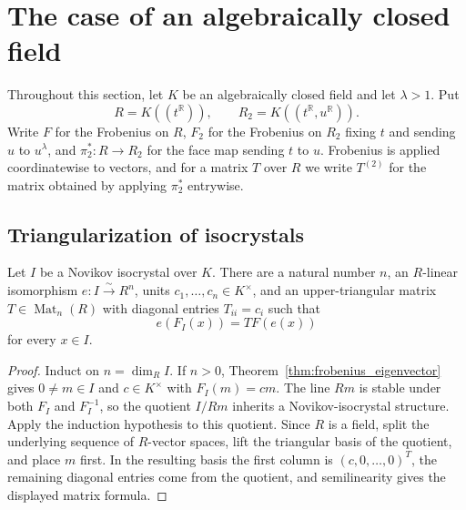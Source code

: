 \section{The case of an algebraically closed field}
\label{sec:algebraically_closed}

Throughout this section, let $K$ be an algebraically closed field and let
$\lambda>1$.  Put
\[
  R=K((t^{\mathbb{R}})), \qquad
  R_2=K((t^{\mathbb{R}},u^{\mathbb{R}})).
\]
Write $F$ for the Frobenius on $R$, $F_2$ for the Frobenius on $R_2$ fixing
$t$ and sending $u$ to $u^\lambda$, and $\pi_2^\ast\colon R\to R_2$ for the face
map sending $t$ to $u$.  Frobenius is applied coordinatewise to vectors, and
for a matrix $T$ over $R$ we write $T^{(2)}$ for the matrix obtained by applying
$\pi_2^\ast$ entrywise.

\subsection{Triangularization of isocrystals}

\begin{theorem}
  \label{thm:nov_isoc_geom_pt_triangular}
  \leanok
  Let $I$ be a Novikov isocrystal over $K$.  There are a natural number $n$, an
  $R$-linear isomorphism $e\colon I\xrightarrow{\sim}R^n$, units
  $c_1,\ldots,c_n\in K^\times$, and an upper-triangular matrix
  $T\in\operatorname{Mat}_n(R)$ with diagonal entries $T_{ii}=c_i$ such that
  \[
    e(F_I(x))=T F(e(x))
  \]
  for every $x\in I$.
\end{theorem}

\begin{proof}
  \leanok
  Induct on $n=\dim_R I$.  If $n>0$, Theorem~\ref{thm:frobenius_eigenvector}
  gives $0\ne m\in I$ and $c\in K^\times$ with $F_I(m)=cm$.  The line $Rm$ is
  stable under both $F_I$ and $F_I^{-1}$, so the quotient $I/Rm$ inherits a
  Novikov-isocrystal structure.  Apply the induction hypothesis to this
  quotient.  Since $R$ is a field, split the underlying sequence of
  $R$-vector spaces, lift the triangular basis of the quotient, and place $m$
  first.  In the resulting basis the first column is $(c,0,\ldots,0)^T$, the
  remaining diagonal entries come from the quotient, and semilinearity gives
  the displayed matrix formula.
\end{proof}


